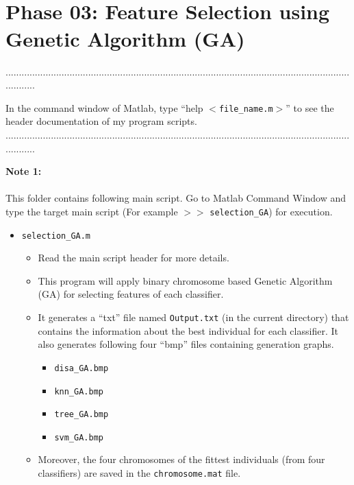 \documentclass[a4paper,12pt]{article} %
\begin{document}
\pagestyle{fancy}
 \renewcommand{\headrulewidth}{1pt}
\sectionfont{\fontsize{12}{15}\selectfont}
\vspace{2cm}


\section*{\\Phase 03: Feature Selection using Genetic Algorithm (GA)}
............................................................................................................................................

In the command window of Matlab, type ``help $<$\verb|file_name.m|$>$'' to see the header documentation of my program scripts.\\
............................................................................................................................................

\textbf{Note 1:}\\\\
This folder contains following main script. Go to Matlab Command Window and type the target main script (For example $>>$  \verb|selection_GA|) for execution.
\begin{itemize}
	\item \verb|selection_GA.m|   
		\begin{itemize}
		\item Read the main script header for more details.
		\item This program will apply binary chromosome based Genetic Algorithm (GA) for selecting features of each classifier.
		\item It generates a ``txt'' file named \verb|Output.txt| (in the current directory) that contains the information about the best individual for each classifier. It also generates following four ``bmp'' files containing generation graphs.
			\begin{itemize}
				\item \verb|disa_GA.bmp|
				\item \verb|knn_GA.bmp|
				\item \verb|tree_GA.bmp|
				\item \verb|svm_GA.bmp|
			\end{itemize}	
	
		\item Moreover, the four chromosomes of the fittest individuals (from four classifiers) are saved in the \verb|chromosome.mat| file.
		\end{itemize}
\end{itemize}
\end{document}
